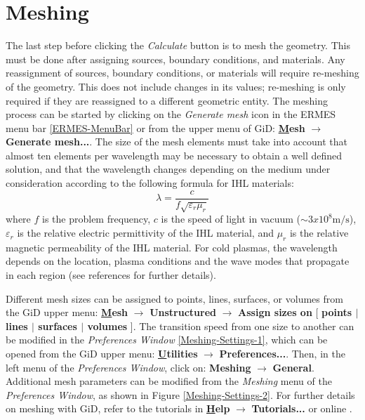 \section{Meshing}

The last step before clicking the \textit{Calculate} button is to mesh the geometry. This must be done after assigning sources, boundary conditions, and materials. Any reassignment of sources, boundary conditions, or materials will require re-meshing of the geometry. This does not include changes in its values; re-meshing is only required if they are reassigned to a different geometric entity. The meshing process can be started by clicking on the \textit{Generate mesh} icon in the ERMES menu bar \ref{ERMES-MenuBar} or from the upper menu of GiD: \textbf{\underline{M}esh} $\rightarrow$ \textbf{Generate mesh...}. The size of the mesh elements must take into account that almost ten elements per wavelength may be necessary to obtain a well defined solution, and that the wavelength changes depending on the medium under consideration according to the following formula for IHL materials:
\begin{equation}\label{WavelenghtIHL}
	\lambda = \frac{c}{f\sqrt{\varepsilon_{r}\mu_{r}}}
\end{equation}
where $f$ is the problem frequency, $c$ is the speed of light in vacuum ($\sim 3x10^{8} \text{m/s}$), $\varepsilon_{r}$ is the relative electric permittivity of the IHL material, and $\mu_{r}$ is the relative magnetic permeability of the IHL material. For cold plasmas, the wavelength depends on the location, plasma conditions and the wave modes that propagate in each region (see references \cite{Swanson, Stix} for further details). 

Different mesh sizes can be assigned to points, lines, surfaces, or volumes from the GiD upper menu: \textbf{\underline{M}esh} $\rightarrow$ \textbf{Unstructured} $\rightarrow$ \textbf{Assign sizes on} [ \textbf{points $\mid$ lines $\mid$ surfaces $\mid$ volumes} ]. The transition speed from one size to another can be modified in the \textit{Preferences Window} \ref{Meshing-Settings-1}, which can be opened from the GiD upper menu: \textbf{\underline{U}tilities} $\rightarrow$ \textbf{Preferences...}. Then, in the left menu of the \textit{Preferences Window}, click on: \textbf{Meshing} $\rightarrow$ \textbf{General}. Additional mesh parameters can be modified from the \textit{Meshing} menu of the \textit{Preferences Window}, as shown in Figure \ref{Meshing-Settings-2}. For further details on meshing with GiD, refer to the tutorials in \textbf{\underline{H}elp} $\rightarrow$ \textbf{Tutorials...} or online \cite{GiDWeb}.

